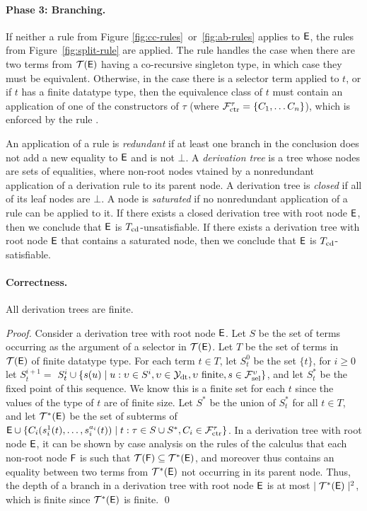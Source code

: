 \paragraph{Phase 3: Branching.}
If neither a rule from Figure \ref{fig:cc-rules}~or~\ref{fig:ab-rules} applies to $\mathsf{E}$, 
the rules from Figure~\ref{fig:split-rule} are applied.
The rule  handles the case when there are two terms from $\mathcal{T}(\mathsf{E})$ having a co-recursive singleton type,
in which case they must be equivalent.
Otherwise, in the case there is a selector term applied to $t$, or if $t$ has a finite datatype type, 
then the equivalence class of $t$ must contain an application of one of the constructors of $\tau$ (where $\mathcal{F}_{\mathrm{ctr}}^\tau = \{ C_1, \ldots C_n \}$), 
which is enforced by the rule .

An application of a rule is \emph{redundant} if at least one branch in the
conclusion does not add a new equality to $\mathsf{E}$ and is not $\bot$.
A \emph{derivation tree} is a tree whose nodes are sets of equalities, where non-root nodes vtained by 
a nonredundant application of a derivation rule to its parent node.
A derivation tree is \emph{closed} if all of its leaf nodes are $\bot$.
A node is \emph{saturated} if no nonredundant application of a rule can be applied to it.
If there exists a closed derivation tree with root node $\mathsf{E}$, then we conclude that $\mathsf{E}$ is $T_{\mathrm{cd}}$-unsatisfiable.
If there exists a derivation tree with root node $\mathsf{E}$ that contains a saturated node, then we conclude that $\mathsf{E}$ is $T_{\mathrm{cd}}$-satisfiable. 

\paragraph{Correctness.}

\begin{lemma}[Termination]%
\label{lem:t}%
\afterDot
All derivation trees are finite.
\end{lemma}
\begin{proof}
Consider a derivation tree with root node $\mathsf{E}$.
Let $S$ be the set of terms occurring as the argument of a selector in $\mathcal{T}(\mathsf{E})$.
Let $T$ be the set of terms in $\mathcal{T}(\mathsf{E})$ of finite datatype type.
For each term $t \in T$,
let $S^0_t$ be the set $\{ t \}$,
for $i \geq 0$ let $S^{i+1}_t =$ $S^i_t \cup \{ s( u ) \mid u : \upsilon \in S^i, \upsilon \in \mathcal{Y}_{\mathrm{dt}}, \upsilon \text{ finite}, s \in \mathcal{F}_{\mathrm{sel}}^{\upsilon}  \}$,
and let $S^\ast_t$ be the fixed point of this sequence.
We know this is a finite set for each $t$ since the values of the type of $t$ are of finite size.
Let $S^\ast$ be the union of $S^\ast_t$ for all $t \in T$,
and let $\mathcal{T}^\ast(\mathsf{E})$ be the set of subterms of $\mathsf{E} \cup \{ C_i( s^1_i( t ), \ldots, s^{a_i}_i( t ) ) \mid t : \tau \in S \cup S^\ast, C_i \in \mathcal{F}_{\mathrm{ctr}}^\tau \}$.
In a derivation tree with root node $\mathsf{E}$, 
it can be shown by case analysis on the rules of the calculus that each non-root node $\mathsf{F}$ is such that 
$\mathcal{T}(\mathsf{F}) \subseteq \mathcal{T}^\ast(\mathsf{E})$, and moreover thus contains an equality between two terms from $\mathcal{T}^\ast(\mathsf{E})$ not occurring in its parent node.
Thus, the depth of a branch in a derivation tree with root node $\mathsf{E}$ is at most $\mid \mathcal{T}^\ast(\mathsf{E}) \mid^2$,
which is finite since $\mathcal{T}^\ast(\mathsf{E})$ is finite.
\qed
\end{proof}

